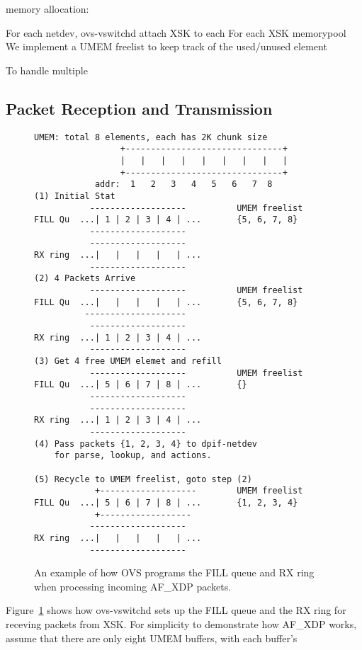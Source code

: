 \documentclass[10pt]{sigplanconf}
\begin{document}
memory allocation:

For each netdev, ovs-vswitchd attach XSK to each 
For each XSK
memorypool
We implement a UMEM freelist to keep track of the used/unused element

To handle multiple 
\subsection{Packet Reception and Transmission}
\begin{figure}
{\scriptsize
\begin{verbatim}
UMEM: total 8 elements, each has 2K chunk size
                 +-------------------------------+
                 |   |   |   |   |   |   |   |   |
                 +-------------------------------+
            addr:  1   2   3   4   5   6   7  8 
(1) Initial Stat
           -------------------          UMEM freelist
FILL Qu  ...| 1 | 2 | 3 | 4 | ...       {5, 6, 7, 8}
           -------------------
           -------------------
RX ring  ...|   |   |   |   | ...
           -------------------
(2) 4 Packets Arrive
           -------------------          UMEM freelist
FILL Qu  ...|   |   |   |   | ...       {5, 6, 7, 8}
          --------------------
           -------------------
RX ring  ...| 1 | 2 | 3 | 4 | ...
           -------------------
(3) Get 4 free UMEM elemet and refill
           -------------------          UMEM freelist
FILL Qu  ...| 5 | 6 | 7 | 8 | ...       {} 
           -------------------
           -------------------
RX ring  ...| 1 | 2 | 3 | 4 | ...
           -------------------
(4) Pass packets {1, 2, 3, 4} to dpif-netdev
    for parse, lookup, and actions.

(5) Recycle to UMEM freelist, goto step (2)
            +-------------------        UMEM freelist
FILL Qu  ...| 5 | 6 | 7 | 8 | ...       {1, 2, 3, 4}
            +------------------
           -------------------
RX ring  ...|   |   |   |   | ...
           -------------------
\end{verbatim}
}
\vspace{-1.0em}
\caption{An example of how OVS programs the FILL queue and RX ring when
processing incoming AF\_XDP packets.}
\label{afxdprx}
\vspace{-1.0em}
\end{figure}
Figure~\ref{afxdprx} shows how ovs-vswitchd sets up the FILL queue and
the RX ring for receving packets from XSK.  For simplicity to demonstrate
how AF\_XDP works, assume that there are only eight UMEM buffers, with each buffer's
\end{document}
